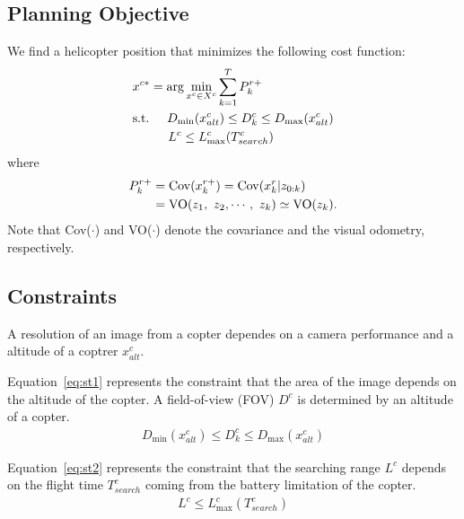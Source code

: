 \documentclass[conference]{IEEEtran}
\begin{document}
\subsection{Planning Objective}

We find a helicopter position that minimizes the following cost function:
\begin{align}
    &x^{c*}=\arg\min_{x^c \in X^c} \sum^T_{k=1} P^{r+}_k\\
     &{\rm s.t.} \hspace{5mm} D_{\min}(x^c_{alt}) \leq D^c_k \leq D_{\max}(x^c_{alt})\label{eq:st1}\\
    &\hspace{10mm} L^c \leq L^c_{\max}(T^c_{search})\label{eq:st2}
\end{align}
where
\begin{align}
P^{r+}_k&={\rm Cov}(x^{r+}_k) = {\rm Cov}(x^{r}_k | z_{0:k})\\
&={\rm VO}(z_1,~z_2,\cdots,~z_k)\simeq {\rm VO}(z_k).
\end{align}
Note that Cov($\cdot$) and VO($\cdot$) denote the covariance and the visual odometry, respectively.

\subsection{Constraints}

A resolution of an image from a copter dependes on a camera performance and a altitude of a coptrer $x^c_{alt}$.

Equation~\eqref{eq:st1} represents the constraint that the area of the image depends on the altitude of the copter.
A field-of-view (FOV) $D^c$ is determined by an altitude of a copter.
\begin{align}
    D_{\min}(x^c_{alt}) \leq D^c_k \leq D_{\max}(x^c_{alt})
\end{align}

Equation~\eqref{eq:st2} represents the constraint that the searching range $L^c$ depends on the flight time $T^c_{search}$ coming from the battery limitation of the copter.
\begin{align}
    L^c \leq L^c_{\max}(T^c_{search})
\end{align}
\end{document}
